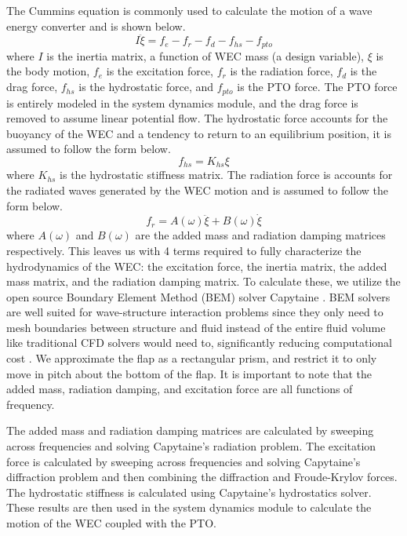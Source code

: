 \documentclass[twocolumn,10pt]{asme2e}
\begin{document}
The Cummins equation is commonly used to calculate the motion of a wave energy converter and is shown below.
\begin{equation}
    \label{eq:cummins}
    I\ddot{\xi} = f_e - f_r - f_d - f_{hs} - f_{pto}  
\end{equation}
where $I$ is the inertia matrix, a function of WEC mass (a design variable), $\xi$ is the body motion, $f_e$ is the excitation force, $f_r$ is the radiation force, $f_d$ is the drag force, $f_{hs}$ is the hydrostatic force, and $f_{pto}$ is the PTO force. The PTO force is entirely modeled in the system dynamics module, and the drag force is removed to assume linear potential flow. The hydrostatic force accounts for the buoyancy of the WEC and a tendency to return to an equilibrium position, it is assumed to follow the form below.
\begin{equation}
    \label{eq:hydrostatic}
    f_{hs} = K_{hs} \xi
\end{equation}
where $K_{hs}$ is the hydrostatic stiffness matrix. The radiation force is accounts for the radiated waves generated by the WEC motion and is assumed to follow the form below.
\begin{equation}
    \label{eq:radiation}
    f_r = A(\omega) \ddot{\xi} + B(\omega) \dot{\xi}
\end{equation}
where $A(\omega)$ and $B(\omega)$ are the added mass and radiation damping matrices respectively. This leaves us with 4 terms required to fully characterize the hydrodynamics of the WEC: the excitation force, the inertia matrix, the added mass matrix, and the radiation damping matrix. To calculate these, we utilize the open source Boundary Element Method (BEM) solver Capytaine \cite{ancellin_capytaine_2019}. BEM solvers are well suited for wave-structure interaction problems since they only need to mesh boundaries between structure and fluid instead of the entire fluid volume like traditional CFD solvers would need to, significantly reducing computational cost \cite{bem_wave}. We approximate the flap as a rectangular prism, and restrict it to only move in pitch about the bottom of the flap. It is important to note that the added mass, radiation damping, and excitation force are all functions of frequency.

The added mass and radiation damping matrices are calculated by sweeping across frequencies and solving Capytaine's radiation problem. The excitation force is calculated by sweeping across frequencies and solving Capytaine's diffraction problem and then combining the diffraction and Froude-Krylov forces. The hydrostatic stiffness is calculated using Capytaine's hydrostatics solver. These results are then used in the system dynamics module to calculate the motion of the WEC coupled with the PTO.
\end{document}
